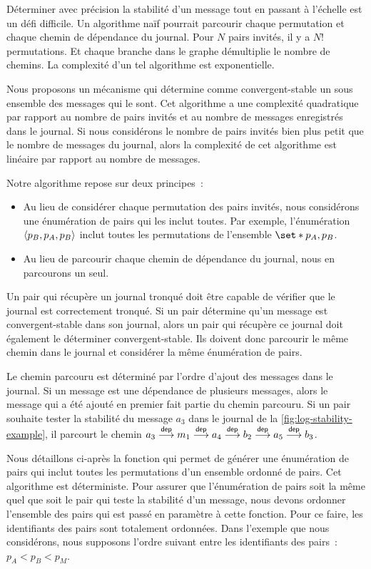Déterminer avec précision la stabilité d'un message tout en passant à l'échelle est un défi difficile.
Un algorithme naïf pourrait parcourir chaque permutation et chaque chemin de dépendance du journal.
Pour $N$ pairs invités, il y a $N!$ permutations.
Et chaque branche dans le graphe démultiplie le nombre de chemins.
La complexité d'un tel algorithme est exponentielle.

Nous proposons un mécanisme qui détermine comme convergent-stable un sous ensemble des messages qui le sont.
Cet algorithme a une complexité quadratique par rapport au nombre de pairs invités et au nombre de messages enregistrés dans le journal.
Si nous considérons le nombre de pairs invités bien plus petit que le nombre de messages du journal, alors la complexité de cet algorithme est linéaire par rapport au nombre de messages.

Notre algorithme repose sur deux principes~:
\begin{itemize}
    \item Au lieu de considérer chaque permutation des pairs invités, nous considérons une énumération de pairs qui les inclut toutes.
    Par exemple, l'énumération $\tuple*{p_B, p_A, p_B}$ inclut toutes les permutations de l'ensemble $\set*{p_A, p_B}$.
    \item Au lieu de parcourir chaque chemin de dépendance du journal, nous en parcourons un seul.
\end{itemize}

Un pair qui récupère un journal tronqué doit être capable de vérifier que le journal est correctement 
tronqué.
Si un pair détermine qu'un message est convergent-stable dans son journal, alors un pair qui récupère ce journal doit également le déterminer convergent-stable.
Ils doivent donc parcourir le même chemin dans le journal et considérer la même énumération de pairs.

Le chemin parcouru est déterminé par l'ordre d'ajout des messages dans le journal.
Si un message est une dépendance de plusieurs messages, alors le message qui a été ajouté en premier fait partie du chemin parcouru.
Si un pair souhaite tester la stabilité du message $a_3$ dans le journal de la \autoref{fig:log-stability-example}, il parcourt le chemin $a_3 \dep m_1 \dep a_4 \dep b_2 \dep a_5 \dep b_3$.

Nous détaillons ci-après la fonction qui permet de générer une énumération de pairs qui inclut toutes les permutations d'un ensemble ordonné de pairs.
Cet algorithme est déterministe.
Pour assurer que l'énumération de pairs soit la même quel que soit le pair qui teste la stabilité d'un message, nous devons ordonner l'ensemble des pairs qui est passé en paramètre à cette fonction.
Pour ce faire, les identifiants des pairs sont totalement ordonnées.
Dans l'exemple que nous considérons, nous supposons l'ordre suivant entre les identifiants des pairs~: $p_A < p_B < p_M$.

